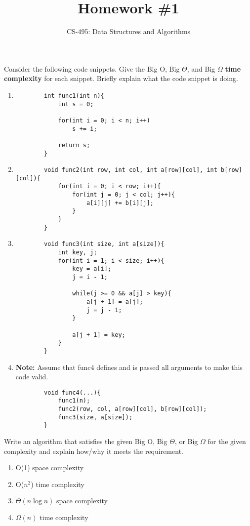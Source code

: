 \documentclass{article}
\title{Homework \#1}
\author{CS-495: Data Structures and Algorithms}
\begin{document}
\date{}
\maketitle

Consider the following code snippets. Give the Big O, Big $\Theta$, and Big $\Omega$ \textbf{time complexity} for each snippet. Briefly explain what the code snippet is doing.
\begin{enumerate}
	\item %
	\begin{verbatim}
		int func1(int n){
			int s = 0;

			for(int i = 0; i < n; i++)
				s += i;

			return s;
		}
	\end{verbatim}
	\item %
	\begin{verbatim}
		void func2(int row, int col, int a[row][col], int b[row][col]){
			for(int i = 0; i < row; i++){
				for(int j = 0; j < col; j++){
					a[i][j] += b[i][j];
				}
			}
		}
	\end{verbatim}
	\item %
	\begin{verbatim}
		void func3(int size, int a[size]){
			int key, j;	
			for(int i = 1; i < size; i++){
				key = a[i];
				j = i - 1;

				while(j >= 0 && a[j] > key){
					a[j + 1] = a[j];
					j = j - 1;
				}

				a[j + 1] = key;
			}
		}
	\end{verbatim}
	\item \textbf{Note:} Assume that func4 defines and is passed all arguments to make this code valid.
	\begin{verbatim}
		void func4(...){
			func1(n);
			func2(row, col, a[row][col], b[row][col]);
			func3(size, a[size]);
		}
	\end{verbatim}
\end{enumerate}
Write an algorithm that satisfies the given Big O, Big $\Theta$, or Big $\Omega$ for the given complexity and explain how/why it meets the requirement.
\begin{enumerate}
	\item O(1) space complexity
	\item O($n^2$) time complexity
	\item $\Theta(n\log n)$ space complexity
	\item $\Omega(n)$ time complexity
\end{enumerate}
\end{document}
